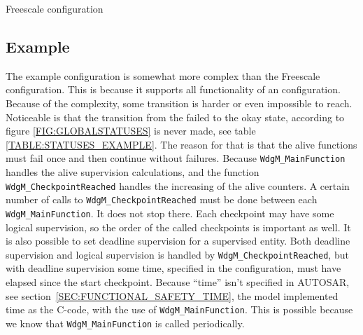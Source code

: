 \begin{table}[!ht]
  \caption{Freescale configuration}
  \label{TABLE:STATUSES_FREESCALE}
  
\end{table}

\subsection{Example}
The example configuration is somewhat more complex than the Freescale
configuration. This is because it supports all functionality of an
configuration. Because of the complexity, some transition is harder or even
impossible to reach. Noticeable is that the transition from the failed to
the okay state, according to figure \ref{FIG:GLOBALSTATUSES} is never made, see
table \ref{TABLE:STATUSES_EXAMPLE}. The reason for that is that the alive
functions must fail once and then continue without failures. Because
\lstinline!WdgM_MainFunction! handles the alive supervision calculations, and
the function \lstinline!WdgM_CheckpointReached! handles the increasing of
the alive counters. A certain number of calls to
\lstinline!WdgM_CheckpointReached! must be done between each
\lstinline!WdgM_MainFunction!. It does not stop there. Each checkpoint may have
some logical supervision, so the order of the called checkpoints is important as
well. It is also possible to set deadline supervision for a supervised
entity. Both deadline supervision and logical supervision is handled by
\lstinline!WdgM_CheckpointReached!, but with deadline supervision some time,
specified in the configuration, must have elapsed since the start
checkpoint. Because ``time'' isn't specified in AUTOSAR, see
section~\ref{SEC:FUNCTIONAL_SAFETY_TIME}, the model implemented time as the
C-code, with the use of \lstinline!WdgM_MainFunction!. This is possible because
we know that \lstinline!WdgM_MainFunction! is called periodically.

